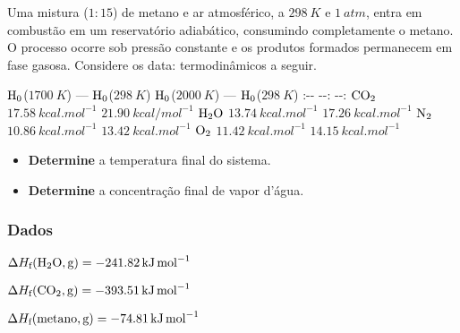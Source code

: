 \documentclass[braun, twocolumn]{braun}
\begin{document}
\begin{problem}
[2A40]Uma mistura (\(1:15\)) de metano e ar atmosférico, a \(\qty{298}{K}\) e
\(\qty{1}{atm}\), entra em combustão em um reservatório adiabático,
consumindo completamente o metano. O processo ocorre sob pressão
constante e os produtos formados permanecem em fase gasosa. Considere os
data: termodinâmicos a seguir.

\textbar{} \textbar{} \(\ce{H0}\)(\(\qty{1700}{K}\)) ---
\(\ce{H0}\)(\(\qty{298}{K}\)) \textbar{} \(\ce{H0}\)(\(\qty{2000}{K}\)) ---
\(\ce{H0}\)(\(\qty{298}{K}\)) \textbar{} \textbar{} :-\/- \textbar{} -\/-:
\textbar{} -\/-: \textbar{} \textbar{} \(\ce{CO2}\) \textbar{}
\(\qty{17,58}{kcal.mol^{-1}}\) \textbar{} \(\qty{21,90}{kcal/mol^{-1}}\)
\textbar{} \textbar{} \(\ce{H2O}\) \textbar{} \(\qty{13,74}{kcal.mol^{-1}}\)
\textbar{} \(\qty{17,26}{kcal.mol^{-1}}\) \textbar{} \textbar{} \(\ce{N2}\)
\textbar{} \(\qty{10,86}{kcal.mol^{-1}}\) \textbar{}
\(\qty{13,42}{kcal.mol^{-1}}\) \textbar{} \textbar{} \(\ce{O2}\) \textbar{}
\(\qty{11,42}{kcal.mol^{-1}}\) \textbar{} \(\qty{14,15}{kcal.mol^{-1}}\)
\textbar{}

\begin{itemize}

\item
  \textbf{Determine} a temperatura final do sistema.
\item
  \textbf{Determine} a concentração final de vapor d'água.
\end{itemize}
\subsubsection*{Dados}


\begin{datalist}

\item $\Delta H_\text{f}(\ce{H2O, {g}}) = \qty{-241,82}{kJ.mol^{-1}}$
\item $\Delta H_\text{f}(\ce{CO2, {g}}) = \qty{-393,51}{kJ.mol^{-1}}$
\item $\Delta H_\text{f}(\ce{metano, {g}}) = \qty{-74,81}{kJ.mol^{-1}}$
\end{datalist}

\end{problem}
\end{document}
